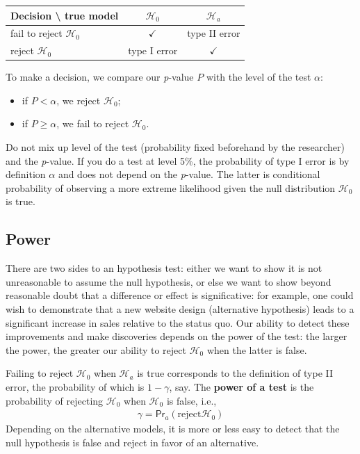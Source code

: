 \documentclass[
  11pt,
  letterpaper,
]{book}
\providecommand{\tightlist}{%
  \setlength{\itemsep}{0pt}\setlength{\parskip}{0pt}}
\theoremstyle{definition}
\theoremstyle{definition}
\theoremstyle{definition}
\theoremstyle{definition}
\theoremstyle{remark}
\begin{document}
\begin{longtable}[]{@{}lcc@{}}
\toprule
\textbf{Decision} \textbackslash{} \textbf{true model} & \(\mathscr{H}_0\) & \(\mathscr{H}_a\) \\
\midrule
\endhead
fail to reject \(\mathscr{H}_0\) & \(\checkmark\) & type II error \\
reject \(\mathscr{H}_0\) & type I error & \(\checkmark\) \\
\bottomrule
\end{longtable}

To make a decision, we compare our \emph{p}-value \(P\) with the level of the test \(\alpha\):

\begin{itemize}
\tightlist
\item
  if \(P < \alpha\), we reject \(\mathscr{H}_0\);
\item
  if \(P \geq \alpha\), we fail to reject \(\mathscr{H}_0\).
\end{itemize}

Do not mix up level of the test (probability fixed beforehand by the researcher) and the \emph{p}-value. If you do a test at level 5\%, the probability of type I error is by definition \(\alpha\) and does not depend on the \emph{p}-value. The latter is conditional probability of observing a more extreme likelihood given the null distribution \(\mathscr{H}_0\) is true.

\hypertarget{power}{%
\subsection{Power}\label{power}}

There are two sides to an hypothesis test: either we want to show it is not unreasonable to assume the null hypothesis, or else we want to show beyond reasonable doubt that a difference or effect is significative: for example, one could wish to demonstrate that a new website design (alternative hypothesis) leads to a significant increase in sales relative to the status quo. Our ability to detect these improvements and make discoveries depends on the power of the test: the larger the power, the greater our ability to reject \(\mathscr{H}_0\) when the latter is false.

Failing to reject \(\mathscr{H}_0\) when \(\mathscr{H}_a\) is true corresponds to the definition of type II error, the probability of which is \(1-\gamma\), say. The \textbf{power of a test} is the probability of rejecting \(\mathscr{H}_0\) when \(\mathscr{H}_0\) is false, i.e.,
\begin{align*}
\gamma = \mathsf{Pr}_a(\text{reject} \mathscr{H}_0)
\end{align*}
Depending on the alternative models, it is more or less easy to detect that the null hypothesis is false and reject in favor of an alternative.
\end{document}
